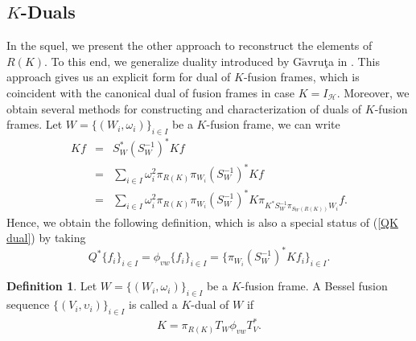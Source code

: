 \documentclass{birkjour}
\theoremstyle{definition}
\newtheorem{defn}[thm]{Definition}
\theoremstyle{remark}
\numberwithin{equation}{section}
\begin{document}
\subsection{$K$-Duals}
In the squel, we present the other approach to reconstruct   the elements of $R(K)$. To this end, we  generalize  duality introduced by G$\breve{\textrm{a}}$vru\c{t}a in \cite{Gav02}. This approach gives us an explicit form for dual of $K$-fusion frames, which is coincident with the canonical dual of fusion frames in case $K=I_{\mathcal{H}}$. Moreover, we obtain several methods for constructing and characterization of  duals of  $K$-fusion frames.
Let   $W = \lbrace (W_{i}, \omega_{i})\rbrace_{i\in I}$ be a $K$-fusion frame, we can write
\begin{eqnarray*}
Kf &=& S_{W}^{*}(S_{W}^{-1})^{*}Kf\\
&=&\sum_{i\in I}\omega_{i}^{2}\pi_{R(K)}\pi_{W_{i}}(S_{W}^{-1})^{*}Kf\\
&=&\sum_{i\in I}\omega_{i}^{2}\pi_{R(K)}\pi_{W_{i}}(S_{W}^{-1})^{*}K\pi_{K^{*}S_{W}^{-1}\pi_{S_{W}(R(K))}W_{i}}f.
\end{eqnarray*}
Hence,  we obtain  the following definition, which is also a  special status of  (\ref{QK dual}) by taking  
\begin{equation*}
Q^{*}\{f_{i}\}_{i\in I}  =\phi_{vw}\{f_{i}\}_{i\in I} = \{\pi_{W_{i}}(S_{W}^{-1})^{*}Kf_{i}\}_{i\in I}.
\end{equation*}
\begin{defn}\label{10}
Let $W = \lbrace (W_{i}, \omega_{i})\rbrace_{i\in I}$ be a $K$-fusion frame.
A Bessel fusion sequence $\lbrace(V_{i},\upsilon_{i})\rbrace_{i\in I}$ is
called a $K$-dual of $W$ if
\begin{eqnarray}\label{Kdual2}
K = \pi_{R(K)}T_{W}\phi_{vw}T^{*}_{V}.
 \end{eqnarray}
\end{defn}
\end{document}
